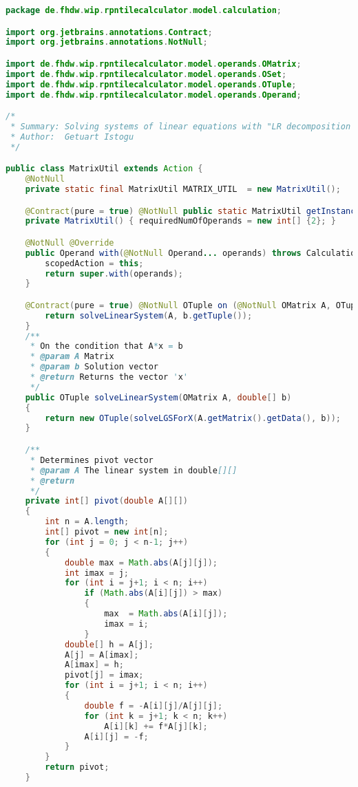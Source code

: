 \begin{lstlisting}[caption=MatrixUtil (Istogu),label=list:MatrixUtil,language=Java]
package de.fhdw.wip.rpntilecalculator.model.calculation;

import org.jetbrains.annotations.Contract;
import org.jetbrains.annotations.NotNull;

import de.fhdw.wip.rpntilecalculator.model.operands.OMatrix;
import de.fhdw.wip.rpntilecalculator.model.operands.OSet;
import de.fhdw.wip.rpntilecalculator.model.operands.OTuple;
import de.fhdw.wip.rpntilecalculator.model.operands.Operand;

/*
 * Summary: Solving systems of linear equations with "LR decomposition with column pivot search"
 * Author:  Getuart Istogu
 */

public class MatrixUtil extends Action {
    @NotNull
    private static final MatrixUtil MATRIX_UTIL  = new MatrixUtil();

    @Contract(pure = true) @NotNull public static MatrixUtil getInstance() { return MATRIX_UTIL; }
    private MatrixUtil() { requiredNumOfOperands = new int[] {2}; }

    @NotNull @Override
    public Operand with(@NotNull Operand... operands) throws CalculationException {
        scopedAction = this;
        return super.with(operands);
    }

    @Contract(pure = true) @NotNull OTuple on (@NotNull OMatrix A, OTuple b) {
        return solveLinearSystem(A, b.getTuple());
    }
    /**
     * On the condition that A*x = b
     * @param A Matrix
     * @param b Solution vector
     * @return Returns the vector 'x'
     */
    public OTuple solveLinearSystem(OMatrix A, double[] b)
    {
        return new OTuple(solveLGSForX(A.getMatrix().getData(), b));
    }

    /**
     * Determines pivot vector
     * @param A The linear system in double[][]
     * @return
     */
    private int[] pivot(double A[][])
    {
        int n = A.length;
        int[] pivot = new int[n];
        for (int j = 0; j < n-1; j++)
        {
            double max = Math.abs(A[j][j]);
            int imax = j;
            for (int i = j+1; i < n; i++)
                if (Math.abs(A[i][j]) > max)
                {
                    max  = Math.abs(A[i][j]);
                    imax = i;
                }
            double[] h = A[j];
            A[j] = A[imax];
            A[imax] = h;
            pivot[j] = imax;
            for (int i = j+1; i < n; i++)
            {
                double f = -A[i][j]/A[j][j];
                for (int k = j+1; k < n; k++)
                    A[i][k] += f*A[j][k];
                A[i][j] = -f;
            }
        }
        return pivot;
    }


\end{lstlisting}
